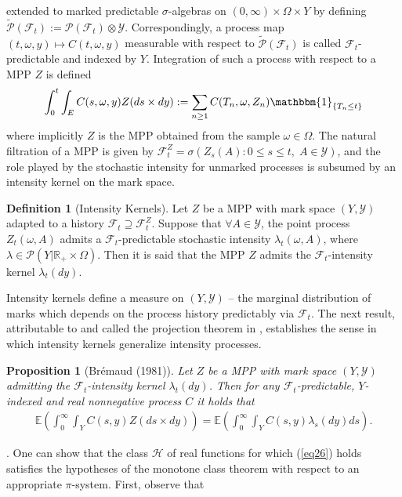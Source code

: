 \documentclass[12pt, oneside]{report}
\newcommand{\E}{\mathbb{E}}
\newcommand{\mbb}[1]{\mathbb{#1}}
\newcommand{\1}[1]{\mathbbm{1}_{\{#1\}}}
\newcommand{\mc}[1]{\mathcal{#1}}
\newtheorem{proposition}[theorem]{Proposition}
\theoremstyle{definition}
\newtheorem{definition}[theorem]{Definition}
\begin{document}
extended to marked predictable $\sigma$-algebras on
$(0,\infty)\times\Omega\times Y$ by defining
$\widetilde{\mc{P}}(\mc{F}_t):=\mc{P}(\mc{F}_t)\otimes\mc{Y}$. Correspondingly,
a process map $(t,\omega,y)\mapsto C(t,\omega,y)$ measurable with respect to
$\widetilde{\mc{P}}(\mc{F}_t)$ is called $\mc{F}_t$-predictable and indexed by
$Y$. Integration of such a process with respect to a MPP $Z$ is defined
\begin{align}
    \int_0^t\int_EC(s,\omega,y)Z(ds\times dy):=\sum_{n\geq 1}C(T_n,\omega, Z_n)\1{T_n\leq t}
\end{align}
where implicitly $Z$ is the MPP obtained from the sample $\omega\in\Omega$. The
natural filtration of a MPP is given by $\mc{F}^Z_t=\sigma(Z_s(A):0\leq s\leq
t,\;A\in\mc{Y})$, and the role played by the stochastic intensity for unmarked
processes is subsumed by an intensity kernel on the mark space.
\begin{definition}[Intensity Kernels]\label{def20} Let $Z$ be a MPP with mark
    space $(Y,\mc{Y})$ adapted to a history $\mc{F}_t\supseteq\mc{F}_t^Z$.
    Suppose that $\forall A\in \mc{Y}$, the point process $Z_t(\omega, A)$
    admits a $\mc{F}_t$-predictable stochastic intensity $\lambda_t(\omega, A)$,
    where $\lambda\in\mc{P}(Y|\mbb{R}_+\times\Omega)$. Then it is said that the
    MPP $Z$ admits the $\mc{F}_t$-intensity kernel $\lambda_t(dy)$.
\end{definition}
Intensity kernels define a measure on $(Y,\mc{Y})$ -- the marginal distribution of marks which
depends on the process history predictably via $\mc{F}_t$.
The next result, attributable to \cite{Jacod_1975} and called the projection theorem
in \cite[ch.8, theorem 3]{Bremaud_1981}, establishes the sense in which intensity kernels generalize
intensity processes.
\begin{proposition}[Br\'emaud (1981)]\label{prop1} Let $Z$ be a
    MPP with mark space $(Y,\mc{Y})$ admitting the $\mc{F}_t$-intensity kernel
    $\lambda_t(dy)$. Then for any $\mc{F}_t$-predictable, $Y$-indexed and real
    nonnegative process $C$ it holds that
    \begin{align}
        \E\left(\int_0^\infty\int_YC(s,y)Z(ds\times dy)\right)=\E\left(\int_0^\infty\int_YC(s,y)\lambda_s(dy)ds\right).\label{eq26}
    \end{align}
\end{proposition}
. One can show that the class $\mc{H}$ of real functions
for which (\ref{eq26}) holds satisfies the hypotheses of the monotone class
theorem with respect to an appropriate $\pi$-system. First, observe that
\end{document}
